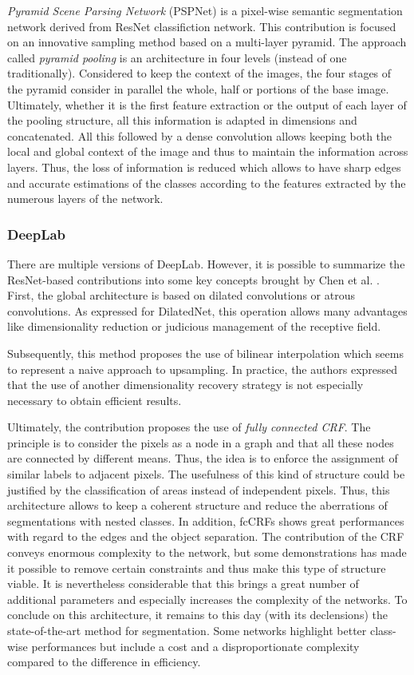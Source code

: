 \emph{Pyramid Scene Parsing Network} (PSPNet) \cite{zhao2017pyramid} is a pixel-wise semantic segmentation network derived from ResNet classifiction network. 
This contribution is focused on an innovative sampling method based on a multi-layer pyramid. The approach called \emph{pyramid pooling} is an architecture in four levels (instead of one traditionally). Considered to keep the context of the images, the four stages of the pyramid consider in parallel the whole, half or portions of the base image. Ultimately, whether it is the first feature extraction or the output of each layer of the pooling structure, all this information is adapted in dimensions and concatenated. All this followed by a dense convolution allows keeping both the local and global context of the image and thus to maintain the information across layers. Thus, the loss of information is reduced which allows to have sharp edges and accurate estimations of the classes according to the features extracted by the numerous layers of the network.

\subsubsection{DeepLab}

There are multiple versions of DeepLab. However, it is possible to summarize the ResNet-based contributions into some key concepts brought by Chen et al. \cite{chen2018deeplab}.
First, the global architecture is based on dilated convolutions or atrous convolutions. As expressed for DilatedNet, this operation allows many advantages like dimensionality reduction or judicious management of the receptive field.

Subsequently, this method proposes the use of bilinear interpolation which seems to represent a naive approach to upsampling. In practice, the authors expressed that the use of another dimensionality recovery strategy is not especially necessary to obtain efficient results.

Ultimately, the contribution proposes the use of \emph{fully connected CRF}. The principle is to consider the pixels as a node in a graph and that all these nodes are connected by different means. Thus, the idea is to enforce the assignment of similar labels to adjacent pixels. The usefulness of this kind of structure could be justified by the classification of areas instead of independent pixels. Thus, this architecture allows to keep a coherent structure and reduce the aberrations of segmentations with nested classes. In addition, fcCRFs shows great performances with regard to the edges and the object separation.
The contribution of the CRF conveys enormous complexity to the network, but some demonstrations \cite{krahenbuhl2011efficient} has made it possible to remove certain constraints and thus make this type of structure viable.
It is nevertheless considerable that this brings a great number of additional parameters and especially increases the complexity of the networks.
To conclude on this architecture, it remains to this day (with its declensions) the state-of-the-art method for segmentation. Some networks highlight better class-wise performances but include a cost and a disproportionate complexity compared to the difference in efficiency.

